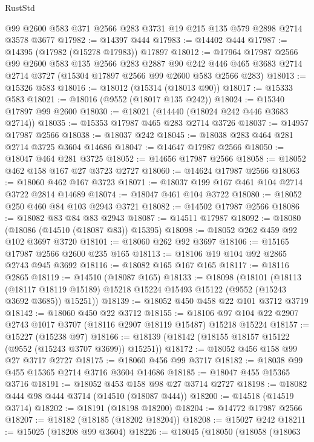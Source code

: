 \begin{lexlean}{RustStd}
\begin{coremodule}
    @99
    @2600
    @583
    @371
    @2566
    @283
    @3731
    @19
    @215
    @135
    @579
    @2898
    @2714
    @3578
    @3677
@17982 := @14397 @444
@17983 := @14402 @444
@17987 := @14395 (@17982 (@15278 @17983)) @17897
@18012 := @17964
    @17987
    @2566
    @99
    @2600
    @583
    @135
    @2566
    @283
    @2887
    @90
    @242
    @446
    @465
    @3683
    @2714
    @2714
    @3727
    (@15304 @17897 @2566 @99 @2600 @583 @2566 @283)
@18013 := @15326 @583
@18016 := @18012 (@15314 (@18013 @90))
@18017 := @15333 @583
@18021 := @18016 (@9552 (@18017 @135 @242))
@18024 := @15340 @17897 @99 @2600
@18030 := @18021 (@14440 (@18024 @242 @446 @3683 @2714))
@18035 := @15353 @17987 @465 @283 @2714 @3726
@18037 := @14957 @17987 @2566
@18038 := @18037 @242
@18045 := @18038 @283 @464 @281 @2714 @3725 @3604 @14686
@18047 := @14647 @17987 @2566
@18050 := @18047 @464 @281 @3725
@18052 := @14656 @17987 @2566
@18058 := @18052 @462 @158 @167 @27 @3723 @2727
@18060 := @14624 @17987 @2566
@18063 := @18060 @462 @167 @3723
@18071 := @18037 @199 @167 @461 @104 @2714 @3722 @2814 @14689
@18074 := @18047 @461 @104 @3722
@18080 := @18052 @250 @460 @84 @103 @2943 @3721
@18082 := @14502 @17987 @2566
@18086 := @18082 @83 @84 @83 @2943
@18087 := @14511 @17987
@18092 := @18080 (@18086 (@14510 (@18087 @83)) @15395)
@18098 := @18052 @262 @459 @92 @102 @3697 @3720
@18101 := @18060 @262 @92 @3697
@18106 := @15165 @17987 @2566 @2600 @235 @165
@18113 := @18106 @19 @104 @92 @2865 @2743 @945 @3692
@18116 := @18082 @165 @167 @165
@18117 := @18116 @2865
@18119 := @14510 (@18087 @165)
@18133 := @18098
    (@18101
      (@18113
        (@18117 @18119 @15189)
        @15218
        @15224
        @15493
        @15122
        (@9552 (@15243 @3692 @3685))
        @15251))
@18139 := @18052 @450 @458 @22 @101 @3712 @3719
@18142 := @18060 @450 @22 @3712
@18155 := @18106 @97 @104 @22 @2907 @2743 @1017 @3707 (@18116 @2907 @18119 @15487) @15218 @15224
@18157 := @15227 (@15238 @97)
@18166 := @18139 (@18142 (@18155 @18157 @15122 (@9552 (@15243 @3707 @3699)) @15251))
@18172 := @18052 @456 @158 @99 @27 @3717 @2727
@18175 := @18060 @456 @99 @3717
@18182 := @18038 @99 @455 @15365 @2714 @3716 @3604 @14686
@18185 := @18047 @455 @15365 @3716
@18191 := @18052 @453 @158 @98 @27 @3714 @2727
@18198 := @18082 @444 @98 @444 @3714 (@14510 (@18087 @444))
@18200 := @14518 (@14519 @3714)
@18202 := @18191 (@18198 @18200)
@18204 := @14772 @17987 @2566
@18207 := @18182 (@18185 (@18202 @18204))
@18208 := @15027 @242
@18211 := @15025 (@18208 @99 @3604)
@18226 := @18045
    (@18050
      (@18058
        (@18063

\end{coremodule}
\end{lexlean}
